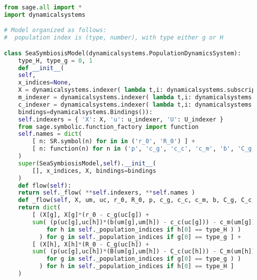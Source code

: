 \begin{lstlisting}[language=Python]
from sage.all import * 
import dynamicalsystems

# Model organized as follows:
#  population index is (type, number), with type either g or H

class SeaSymbiosisModel(dynamicalsystems.PopulationDynamicsSystem):
    type_H, type_g = 0, 1
    def __init__(
	self,
	x_indices=None,
	X = dynamicalsystems.indexer( lambda t,i: dynamicalsystems.subscriptedsymbol( 'N', t, i ),
	m_indexer = dynamicalsystems.indexer( lambda t,i: dynamicalsystems.subcriptedsymbol( t == type_H ? 'X':'x', 'm', i) ),
	c_indexer = dynamicalsystems.indexer( lambda t,i: dynamicalsystems.subcriptedsymbol( t == type_H ? 'X':'x', 'c', i) ),
	bindings=dynamicalsystems.Bindings()):
	self.indexers = { 'X': X, 'u': u_indexer, 'U': U_indexer }
	from sage.symbolic.function_factory import function
	self.names = dict( 
		[ n: SR.symbol(n) for in in ('r_0', 'R_0') ] +
		[ n: function(n) for n in ('p', 'c_g', 'c_c', 'c_m', 'b', 'C_g', 'C_c', 'C_m', 'B') ]
	)
	super(SeaSymbiosisModel,self).__init__(
	    [], x_indices, X, bindings=bindings
	)
    def flow(self):
	return self._flow( **self.indexers, **self.names )
    def _flow(self, X, um, uc, r_0, R_0, p, c_g, c_c, c_m, b, C_g, C_c, C_m, B ):
	return dict(
	    [ (X[g], X[g]*(r_0 - c_g(uc[g]) +
		sum( (p(uc[g],uc[h])*(b(um[g],um[h]) - c_c(uc[g])) - c_m(um[g]))*X[h]
			for h in self._population_indices if h[0] == type_H ) )
	      ) for g in self._population_indices if g[0] == type_g ] +
	    [ (X[h], X[h]*(R_0 - C_g(uc[h]) +
		sum( (p(uc[g],uc[h])*(B(um[g],um[h]) - C_c(uc[h])) - C_m(um[h]))*X[g]
			for g in self._population_indices if g[0] == type_g ) )
	      ) for h in self._population_indices if h[0] == type_H ]
	)
\end{lstlisting}
